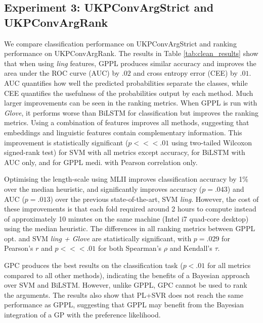 \subsection{Experiment 3: UKPConvArgStrict and UKPConvArgRank}
% 
% 
%
We compare classification performance on UKPConvArgStrict  
and ranking performance on UKPConvArgRank. 
The results in Table \ref{tab:clean_results} show that when using \emph{ling} features,
GPPL produces similar accuracy and improves the area under the ROC curve (AUC) by $.02$ and cross entropy error (CEE) by $.01$.
AUC quantifies how well the predicted probabilities separate the classes,
while CEE quantifies the usefulness of the probabilities output by each method.
Much larger improvements can be seen in the ranking metrics. 
When GPPL is run with \emph{Glove}, it performs worse than
BiLSTM for classification but improves the ranking metrics. 
Using a combination of features improves all methods, suggesting that embeddings and linguistic features contain complementary information. This improvement is statistically significant ($p <\!\!<\!\!< .01$ using two-tailed Wilcoxon signed-rank test) for SVM with all metrics except accuracy, for BiLSTM with AUC only, and for GPPL medi. with Pearson correlation only.

Optimising the length-scale using MLII improves classification accuracy by 1\% over the median heuristic,
and significantly improves accuracy ($p=.043$) and AUC ($p=.013$) 
over the previous state-of-the-art, SVM \emph{ling}.
However, the cost of these improvements is that each fold required around 2 hours to compute instead of 
approximately 10 minutes on the same machine (Intel i7 quad-core desktop) using the median heuristic. 
The differences in all ranking metrics between GPPL opt. and SVM \emph{ling + Glove} 
are statistically significant, with $p=.029$ for Pearson's $r$ and $p<\!\!<\!\!<.01$ for both 
Spearman's $\rho$ and Kendall's $\tau$.

GPC produces the best results on the classification task ($p<.01$ for all metrics compared to all other methods), 
indicating the benefits of a Bayesian approach over SVM and BiLSTM.
However, unlike GPPL, GPC cannot be used to rank the arguments.
The results also show that PL+SVR does not reach the same performance as GPPL, 
suggesting that GPPL may benefit from the Bayesian integration of a GP with the preference likelihood. 

